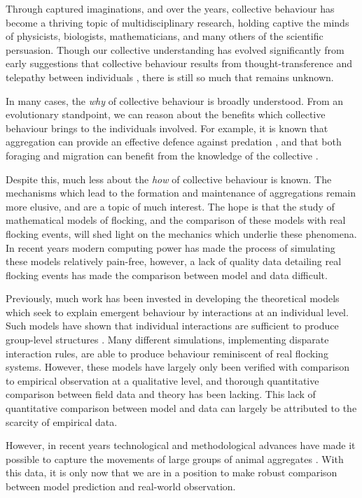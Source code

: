 Through captured imaginations, and over the years, collective behaviour has become a
thriving topic of multidisciplinary research, holding captive the minds of physicists,
biologists, mathematicians, and many others of the scientific persuasion. Though our
collective understanding has evolved significantly from early suggestions that collective
behaviour results from thought-transference and telepathy between individuals
\parencite{selous31}, there is still so much that remains unknown.

In many cases, the \emph{why} of collective behaviour is broadly understood. From an
evolutionary standpoint, we can reason about the benefits which collective behaviour
brings to the individuals involved. For example, it is known that aggregation can provide
an effective defence against predation \parencite{landeau86}, and that both foraging and
migration can benefit from the knowledge of the collective \parencite{simmons04}.

Despite this, much less about the \emph{how} of collective behaviour is known. The
mechanisms which lead to the formation and maintenance of aggregations remain more
elusive, and are a topic of much interest. The hope is that the study of mathematical
models of flocking, and the comparison of these models with real flocking events, will
shed light on the mechanics which underlie these phenomena. In recent years modern
computing power has made the process of simulating these models relatively pain-free,
however, a lack of quality data detailing real flocking events has made the comparison
between model and data difficult.

Previously, much work has been invested in developing the theoretical models which seek to
explain emergent behaviour by interactions at an individual level. Such models have shown
that individual interactions are sufficient to produce group-level structures
\parencite{aoki82}. Many different simulations, implementing disparate interaction rules,
are able to produce behaviour reminiscent of real flocking systems. However, these models
have largely only been verified with comparison to empirical observation at a qualitative
level, and thorough quantitative comparison between field data and theory has been
lacking. This lack of quantitative comparison between model and data can largely be
attributed to the scarcity of empirical data.

However, in recent years technological and methodological advances have made it possible
to capture the movements of large groups of animal aggregates \parencite{ballerini08}.
With this data, it is only now that we are in a position to make robust comparison
between model prediction and real-world observation.

